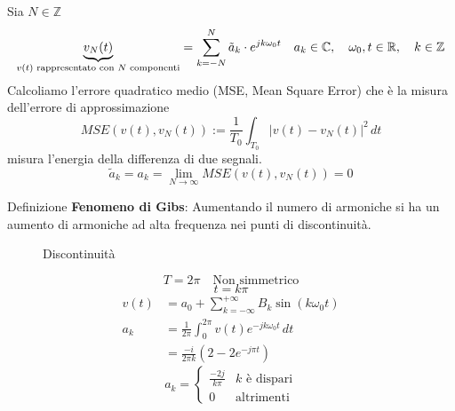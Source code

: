 \documentclass[a4paper]{article}
\begin{document}
\vspace{1em}
\noindent
Sia \( N \in \mathbb{Z} \) 
\[
  \underbrace{v_N(t)}_{\text{\( v(t) \) rappresentato con \( N \) componenti}} =
  \sum_{k=-N}^{N} \tilde{a}_k \cdot e^{j k \omega_0 t} \quad a_k \in \mathbb{C}, \quad \omega_0,t \in \mathbb{R},
  \quad k \in \mathbb{Z}
\] 
Calcoliamo l'errore quadratico medio (MSE, Mean Square Error) che è la misura
dell'errore di approssimazione
\[
  MSE\left(v(t),v_N(t)\right) := \frac{1}{T_0} \int_{T_0} |v(t) - v_N(t)|^2 \, dt
\] 
misura l'energia della differenza di due segnali.
\[
  \tilde{a}_k = a_k = \lim_{N \to \infty} MSE\left(v(t),v_N(t)\right) = 0
\] 
\begin{examplebox}{Definizione}
  \textbf{Fenomeno di Gibs}: Aumentando il numero di armoniche si ha un aumento
  di armoniche ad alta frequenza nei punti di discontinuità.
  \begin{figure}[H]
    \centering
    \caption{Discontinuità}
  \end{figure}
  \[
  T = 2 \pi \quad \text{Non simmetrico}
  \] 
  \[
  t = k \pi 
  \]
  \[
    \begin{aligned}
      v(t) &= a_0 + \sum_{k=-\infty}^{+\infty} B_k \sin(k \omega_0 t)\\
      a_k  &= \frac{1}{2 \pi } \int_{0}^{2 \pi} v(t) e^{-j k \omega_0 t} \, dt \\
           &= \frac{-i}{2 \pi k} \left( 2 - 2 e^{-j \pi t} \right) 
    \end{aligned}
  \] 
  \[
  a_k = \begin{cases}
    \frac{-2 j}{k \pi } & k \text{ è dispari}\\
    0 & \text{altrimenti}
  \end{cases}
  \] 
\end{examplebox}
\end{document}
